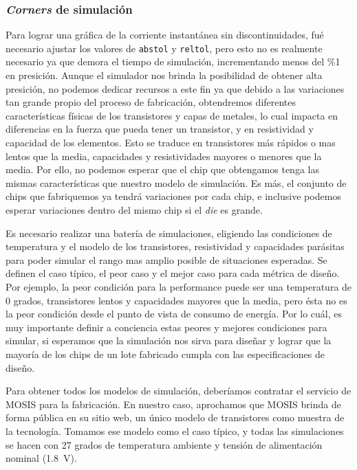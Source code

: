 \subsubsection{\emph{Corners} de simulación}
Para lograr una gráfica de la corriente instantánea sin discontinuidades, fué necesario ajustar los valores de \verb.abstol. y \verb.reltol., pero esto no es realmente necesario ya que demora el tiempo de simulación, incrementando menos del \%1 en presición. Aunque el simulador nos brinda la posibilidad de obtener alta presición, no podemos dedicar recursos a este fin ya que debido a las variaciones tan grande propio del proceso de fabricación, obtendremos diferentes características físicas de los transistores y capas de metales, lo cual impacta en diferencias en la fuerza que pueda tener un transistor, y en resistividad y capacidad de los elementos. Esto se traduce en transistores más rápidos o mas lentos que la media, capacidades y resistividades mayores o menores que la media. Por ello, no podemos esperar que el chip que obtengamos tenga las mismas características que nuestro modelo de simulación. Es más, el conjunto de chips que fabriquemos ya tendrá variaciones por cada chip, e inclusive podemos esperar variaciones dentro del mismo chip si el \emph{die} es grande.

Es necesario realizar una batería de simulaciones, eligiendo las condiciones de temperatura y el modelo de los transistores, resistividad y capacidades parásitas para poder simular el rango mas amplio posible de situaciones esperadas. Se definen el caso típico, el peor caso y el mejor caso para cada métrica de diseño. Por ejemplo, la peor condición para la performance puede ser una temperatura de 0 grados, transistores lentos y capacidades mayores que la media, pero ésta no es la peor condición desde el punto de vista de consumo de energía. Por lo cuál, es muy importante definir a conciencia estas peores y mejores condiciones para simular, si esperamos que la simulación nos sirva para diseñar y lograr que la mayoría de los chips de un lote fabricado cumpla con las especificaciones de diseño. 

Para obtener todos los modelos de simulación, deberíamos contratar el servicio de MOSIS para la fabricación. En nuestro caso, aprochamos que MOSIS brinda de forma pública en su sitio web, un único modelo de transistores como muestra de la tecnología. Tomamos ese modelo como el caso típico, y todas las simulaciones se hacen con 27 grados de temperatura ambiente y tensión de alimentación nominal (1.8~V).



